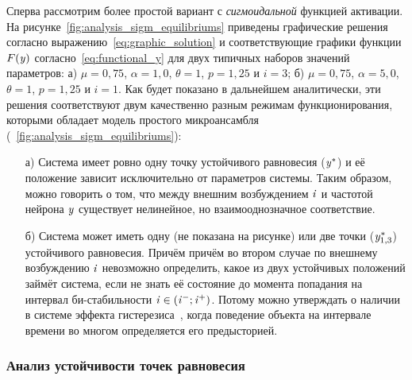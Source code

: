 Сперва рассмотрим более простой вариант с \textit{сигмоидальной} функцией активации. На рисунке~\ref{fig:analysis_sigm_equilibriums} приведены графические решения согласно выражению~\eqref{eq:graphic_solution} и соответствующие графики функции $F(\mathit{y})$ согласно~\eqref{eq:functional_y} для двух типичных наборов значений параметров: а) $\mu = 0,75$, $\alpha = 1,0$, $\theta = 1$, $p = 1,25$ и $i = 3$; б) $\mu = 0,75$, $\alpha = 5,0$, $\theta = 1$, $p = 1,25$ и $i = 1$.
Как будет показано в дальнейшем аналитически, эти решения соответствуют двум качественно разным режимам функционирования, которыми обладает модель простого микроансамбля (\seefigure~\ref{fig:analysis_sigm_equilibriums}):
\begin{itemize}
    \item[а)] Система имеет ровно одну точку устойчивого равновесия ($\mathit{y}^{*}$) и её положение зависит исключительно от параметров системы. Таким образом, можно говорить о том, что между внешним возбуждением $\mathit{i}$ и частотой нейрона $\mathit{y}$ существует нелинейное, но взаимооднозначное соответствие.
    \item[б)] Система может иметь одну (не показана на рисунке) или две точки ($\mathit{y}_{1,3}^{*}$) устойчивого равновесия. Причём причём во втором случае по внешнему возбуждению $\mathit{i}$ невозможно определить, какое из двух устойчивых положений займёт система, если не знать её состояние до момента попадания на интервал би-стабильности $\mathit{i} \in (\mathit{i}^{-}; \mathit{i}^{+})$. Потому можно утверждать о наличии в системе эффекта гистерезиса~\cite{Krasnoselsky1983}, когда поведение объекта на интервале времени во многом определяется его предысторией.
\end{itemize}

\subsubsection{Анализ устойчивости точек равновесия}

